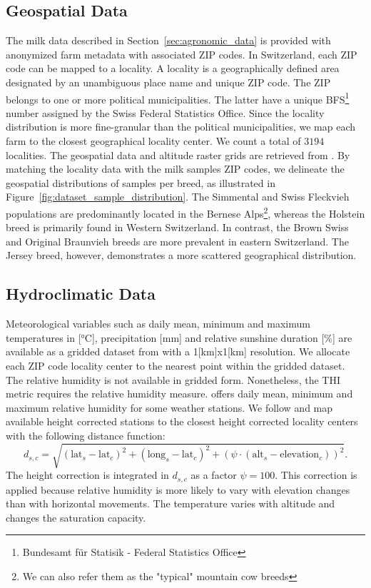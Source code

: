 \subsection{Geospatial Data}\label{sec:topological_data}
The milk data described in Section~\ref{sec:agronomic_data} is provided with anonymized farm metadata with associated ZIP codes. In Switzerland, each ZIP code can be mapped to a locality. A locality is a geographically defined area designated by an unambiguous place name and unique ZIP code. The ZIP belongs to one or more political municipalities. The latter have a unique BFS\footnote{Bundesamt für Statisik - Federal Statistics Office} number assigned by the Swiss Federal Statistics Office. Since the locality distribution is more fine-granular than the political municipalities, we map each farm to the closest geographical locality center. We count a total of $3194$ localities. The geospatial data and altitude raster grids are retrieved from \cite{swisstopo_2024, swisstopo_2024_dhm25}. By matching the locality data with the milk samples ZIP codes, we delineate the geospatial distributions of samples per breed, as illustrated in Figure~\ref{fig:dataset_sample_distribution}. The Simmental and Swiss Fleckvieh populations are predominantly located in the Bernese Alps\footnote{We can also refer them as the "typical" mountain cow breeds}, whereas the Holstein breed is primarily found in Western Switzerland. In contrast, the Brown Swiss and Original Braunvieh breeds are more prevalent in eastern Switzerland. The Jersey breed, however, demonstrates a more scattered geographical distribution.



\subsection{Hydroclimatic Data}\label{sec:meteo_data}
Meteorological variables such as daily mean, minimum and maximum temperatures in [°C], precipitation [mm] and relative sunshine duration [\%] are available as a gridded dataset from \cite{ethz_2024_meteoswiss} with a 1[km]x1[km] resolution. We allocate each ZIP code locality center to the nearest point within the gridded dataset. The relative humidity is not available in gridded form. Nonetheless, the THI metric requires the relative humidity measure. \cite{meteoschweiz_2024_idaweb} offers daily mean, minimum and maximum relative humidity for some weather stations. We follow \cite{bucheli_temperature_2022} and map available height corrected stations to the closest height corrected locality centers with the following distance function: 
\begin{equation}\label{eq:station_distance_function}
    d_{s,c} = \sqrt{(\text{lat}_s - \text{lat}_c)^2 + (\text{long}_s - \text{lat}_c)^2 + \left(\psi \cdot (\text{alt}_s - \text{elevation}_c)\right)^2}.
\end{equation}
The height correction is integrated in $d_{s,c}$ as a factor $\psi=100$. This correction is applied because relative humidity is more likely to vary with elevation changes than with horizontal movements. The temperature varies with altitude and changes the saturation capacity.

